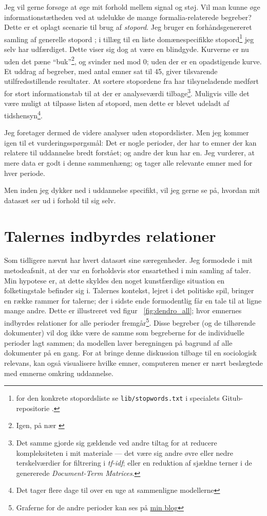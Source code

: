 Jeg vil gerne forsøge at øge mit forhold mellem signal og støj.
Vil man kunne øge informationstætheden ved at udelukke de mange formalia-relaterede begreber?
Dette er et oplagt scenarie til brug af \textit{stopord}.
Jeg bruger en forhåndsgenereret samling af generelle stopord \autocite{stopwords-isoStopwordsISO2020};
i tillæg til en liste domænespecifikke stopord\footnote{
for den konkrete stopordsliste se \texttt{lib/stopwords.txt} i specialets Gitub-repositorie \autocite{andersenNorseghostMasterthesis2020}.}
jeg selv har udfærdiget.
Dette viser sig dog at være en blindgyde.
Kurverne er nu uden det pæne “buk”\footnote{Igen, på nær \autocite{deveaudAccurateEffectiveLatent2014}}, og svinder ned mod 0; uden der er en opadstigende kurve.
Et uddrag af begreber, med antal emner sat til 45, giver tilsvarende utilfredsstillende resultater.
At sortere stopordene fra har tilsyneladende medført for stort informationstab til at der er analyseværdi tilbage\footnote{
Det samme gjorde sig gældende ved andre tiltag for at reducere kompleksiteten i mit materiale —
det være sig andre øvre eller nedre terskelværdier for filtrering i \textit{tf-idf};
eller en reduktion af sjældne terner i de genererede \textit{Document-Term Matrices}.}.
Muligvis ville det være muligt at tilpasse listen af stopord, men dette er blevet udeladt af tidshensyn\footnote{Det tager flere dage til over en uge at sammenligne modellerne}.

Jeg foretager dermed de videre analyser uden stopordslister.
Men jeg kommer igen til et vurderingsspørgsmål:
Det er nogle perioder, der har to emner der kan relatere til uddannelse bredt forstået; og andre der kun har en.
Jeg vurderer, at mere data er godt i denne sammenhæng; og tager alle relevante emner med for hver periode.

Men inden jeg dykker ned i uddannelse specifikt, vil jeg gerne se på, hvordan mit datasæt ser ud i forhold til sig selv.

\section{Talernes indbyrdes relationer}
Som tidligere nævnt har hvert datasæt sine særegenheder.
Jeg formodede i mit metodeafsnit, at der var en forholdsvis stor ensartethed i min samling af taler.
Min hypotese er, at dette skyldes den noget kunstfærdige situation en folketingstale befinder sig i.
Talernes kontekst, lejret i det politiske spil, bringer en række rammer for talerne; der i sidste ende formodentlig får en tale til at ligne mange andre.
Dette er illustreret ved figur ~\ref{fig:dendro_all}; hvor emnernes indbyrdes relationer for alle perioder fremgår\footnote{Graferne for de andre perioder kan ses på \href{martinandreasandersen.com/projects/au/}{min blog}}.
Disse begreber (og de tilhørende dokumenter) vil dog ikke være de samme som begreberne for de individuelle perioder lagt sammen; da modellen laver beregningen på bagrund af alle dokumenter på en gang.
For at bringe denne diskussion tilbage til en sociologisk relevans, kan også visualisere hvilke emner, computeren mener er nært beslægtede med emnerne omkring uddannelse.

